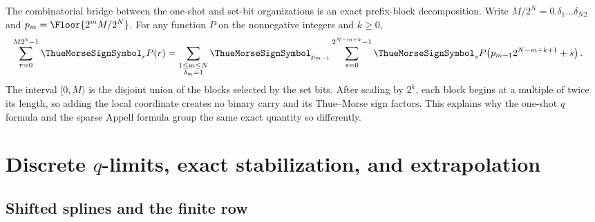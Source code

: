 \documentclass[11pt,oneside]{article}
\theoremstyle{definition}
\theoremstyle{remark}
\begin{document}
The combinatorial bridge between the one-shot and set-bit organizations is an exact
prefix-block decomposition.  Write
$M/2^N=0.\delta_1\ldots\delta_N{}_2$ and
$p_m=\Floor{2^mM/2^N}$.  For any function $P$ on the nonnegative integers and
$k\ge0$,
\begin{align}
 \sum_{r=0}^{M2^k-1}\ThueMorseSignSymbol_rP(r)
 &=\sum_{\substack{1\le m\le N\\\delta_m=1}}
 \ThueMorseSignSymbol_{p_{m-1}}
 \sum_{s=0}^{2^{N-m+k}-1}\ThueMorseSignSymbol_s
 P\!\left(p_{m-1}2^{N-m+k+1}+s\right).
 \label{dyadicweb:eq:prefix-block-decomposition}
\end{align}
The interval $[0,M)$ is the disjoint union of the blocks selected by the set bits.
After scaling by $2^k$, each block begins at a multiple of twice its length, so adding
the local coordinate creates no binary carry and its Thue--Morse sign factors.  This
explains why the one-shot $q$ formula and the sparse Appell formula group the same exact
quantity so differently.

\section[Discrete q-limits, exact stabilization, and extrapolation]{Discrete $q$-limits, exact stabilization, and extrapolation}
\label{dyadicweb:sec:discrete}

\subsection{Shifted splines and the finite row}
\end{document}
